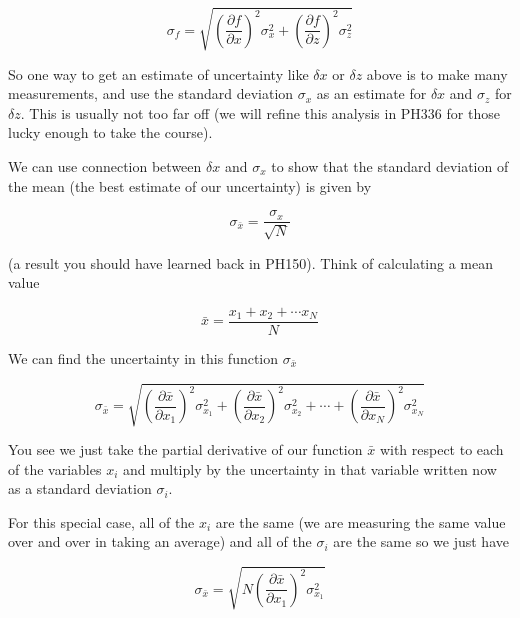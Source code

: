 \begin{equation*}
	\sigma _{f}=\sqrt{\left( \frac{\partial f}{\partial x}\right) ^{2}\sigma_{x}^{2}+\left( \frac{\partial f}{\partial z}\right) ^{2}\sigma _{z}^{2}}
\end{equation*}

So one way to get an estimate of uncertainty like $\delta x$ or $\delta z$ above is to make many measurements, and use the standard deviation $\sigma_{x}$ as an estimate for $\delta x$ and $\sigma _{z}$ for $\delta z.$ This is usually not too far off (we will refine this analysis in PH336 for those lucky enough to take the course).

We can use connection between $\delta x$ and $\sigma _{x}$ to show that the standard deviation of the mean (the best estimate of our uncertainty) is given by

\begin{equation*}
	\sigma _{\bar{x}}=\frac{\sigma _{x}}{\sqrt{N}}
\end{equation*}

(a result you should have learned back in PH150). Think of calculating a mean value

\begin{equation*}
	\bar{x}=\frac{x_{1}+x_{2}+\cdots x_{N}}{N}
\end{equation*}

We can find the uncertainty in this function $\sigma _{\bar{x}}$

\begin{equation*}
	\sigma _{\bar{x}}=\sqrt{\left( \frac{\partial \bar{x}}{\partial x_{1}} \right) ^{2}\sigma _{x_{1}}^{2}+\left( \frac{\partial \bar{x}}{\partial x_{2}}\right) ^{2}\sigma _{x_{2}}^{2}+\cdots +\left( \frac{\partial \bar{x}}{\partial x_{N}}\right) ^{2}\sigma _{x_{N}}^{2}}
\end{equation*}

You see we just take the partial derivative of our function $\bar{x}$ with respect to each of the variables $x_{i}$ and multiply by the uncertainty in that variable written now as a standard deviation $\sigma _{i}.$

For this special case, all of the $x_{i}$ are the same (we are measuring the same value over and over in taking an average) and all of the $\sigma _{i}$ are the same so we just have

\begin{equation*}
	\sigma _{\bar{x}}=\sqrt{N\left( \frac{\partial \bar{x}}{\partial x_{1}} \right) ^{2}\sigma _{x_{1}}^{2}}
\end{equation*}

